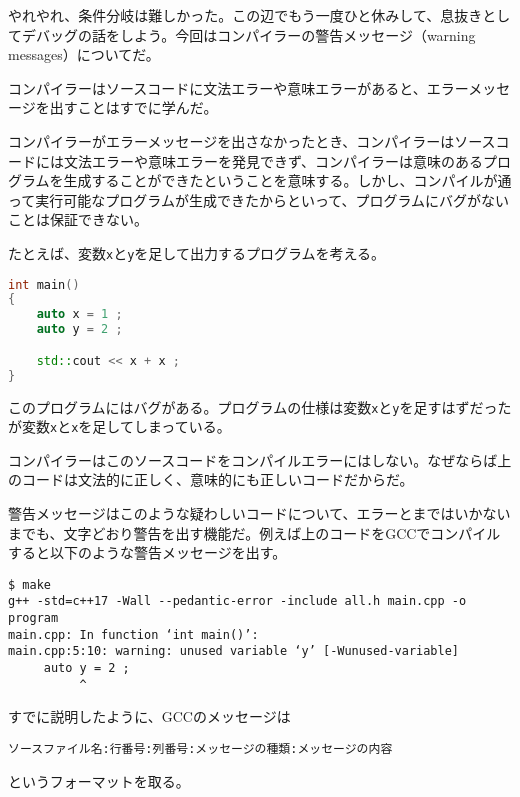 
やれやれ、条件分岐は難しかった。この辺でもう一度ひと休みして、息抜きとしてデバッグの話をしよう。今回はコンパイラーの警告メッセージ（warning messages）についてだ。

コンパイラーはソースコードに文法エラーや意味エラーがあると、エラーメッセージを出すことはすでに学んだ。

コンパイラーがエラーメッセージを出さなかったとき、コンパイラーはソースコードには文法エラーや意味エラーを発見できず、コンパイラーは意味のあるプログラムを生成することができたということを意味する。しかし、コンパイルが通って実行可能なプログラムが生成できたからといって、プログラムにバグがないことは保証できない。

たとえば、変数\texttt{x}と\texttt{y}を足して出力するプログラムを考える。

\begin{lstlisting}[language={C++}]
int main()
{
    auto x = 1 ;
    auto y = 2 ;

    std::cout << x + x ;
}
\end{lstlisting}

このプログラムにはバグがある。プログラムの仕様は変数\texttt{x}と\texttt{y}を足すはずだったが変数\texttt{x}と\texttt{x}を足してしまっている。

コンパイラーはこのソースコードをコンパイルエラーにはしない。なぜならば上のコードは文法的に正しく、意味的にも正しいコードだからだ。

警告メッセージはこのような疑わしいコードについて、エラーとまではいかないまでも、文字どおり警告を出す機能だ。例えば上のコードをGCCでコンパイルすると以下のような警告メッセージを出す。

\begin{lstlisting}[style=terminal]
$ make
g++ -std=c++17 -Wall --pedantic-error -include all.h main.cpp -o program
main.cpp: In function ‘int main()’:
main.cpp:5:10: warning: unused variable ‘y’ [-Wunused-variable]
     auto y = 2 ;
          ^
\end{lstlisting}

すでに説明したように、GCCのメッセージは
\begin{lstlisting}[style=grammar]
ソースファイル名:行番号:列番号:メッセージの種類:メッセージの内容
\end{lstlisting}
というフォーマットを取る。

